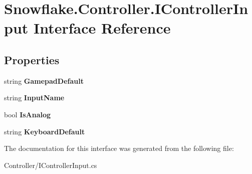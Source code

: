 \hypertarget{interface_snowflake_1_1_controller_1_1_i_controller_input}{}\section{Snowflake.\+Controller.\+I\+Controller\+Input Interface Reference}
\label{interface_snowflake_1_1_controller_1_1_i_controller_input}
\subsection*{Properties}
\begin{DoxyCompactItemize}
\item 
\hypertarget{interface_snowflake_1_1_controller_1_1_i_controller_input_af599b54bfd5d01c182b8fa10f0918ee8}{}string {\bfseries Gamepad\+Default}\label{interface_snowflake_1_1_controller_1_1_i_controller_input_af599b54bfd5d01c182b8fa10f0918ee8}

\item 
\hypertarget{interface_snowflake_1_1_controller_1_1_i_controller_input_aee56ea454294051639b2d30948a9cab5}{}string {\bfseries Input\+Name}\label{interface_snowflake_1_1_controller_1_1_i_controller_input_aee56ea454294051639b2d30948a9cab5}

\item 
\hypertarget{interface_snowflake_1_1_controller_1_1_i_controller_input_a461bb3f22adf309804329b1fc92cee60}{}bool {\bfseries Is\+Analog}\label{interface_snowflake_1_1_controller_1_1_i_controller_input_a461bb3f22adf309804329b1fc92cee60}

\item 
\hypertarget{interface_snowflake_1_1_controller_1_1_i_controller_input_a9599c185a4863e50674e57b10f3ea2dc}{}string {\bfseries Keyboard\+Default}\label{interface_snowflake_1_1_controller_1_1_i_controller_input_a9599c185a4863e50674e57b10f3ea2dc}

\end{DoxyCompactItemize}


The documentation for this interface was generated from the following file\+:\begin{DoxyCompactItemize}
\item 
Controller/I\+Controller\+Input.\+cs\end{DoxyCompactItemize}
